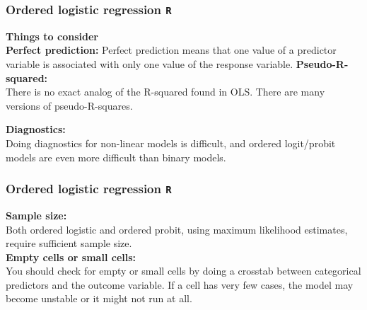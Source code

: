 \documentclass[00-GLMregslides.tex]{subfiles}
\begin{document}
\begin{frame}[fragile]
\frametitle{Ordered logistic regression \texttt{R} }
\Large
\textbf{Things to consider}\\
\textbf{Perfect prediction: }Perfect prediction means that one value of a predictor variable is associated with only one value of the response variable. 
\textbf{Pseudo-R-squared: }\\There is no exact analog of the R-squared found in OLS. There are many versions of pseudo-R-squares. %
\\ \medskip



\textbf{Diagnostics:} \\ Doing diagnostics for non-linear models is difficult, and ordered logit/probit models are even more difficult than binary models.
\end{frame}
\begin{frame}[fragile]
	\frametitle{Ordered logistic regression \texttt{R} }
	\Large
\noindent \textbf{Sample size:}\\  Both ordered logistic and ordered probit, using maximum likelihood estimates, require sufficient sample size.\\ \smallskip
\noindent \textbf{Empty cells or small cells:} \\You should check for empty or small cells by doing a crosstab between categorical predictors and the outcome variable. If a cell has very few cases, the model may become unstable or it might not run at all.

\end{frame}



\end{document}
